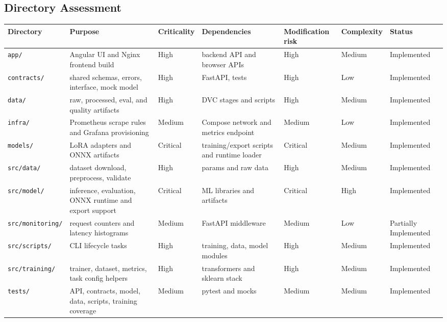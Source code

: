 \subsection{Directory Assessment}
\begin{longtable}{@{}p{}p{}p{}p{}p{}p{}p{}@{}}
\toprule
\textbf{Directory} & \textbf{Purpose} & \textbf{Criticality} & \textbf{Dependencies} & \textbf{Modification risk} & \textbf{Complexity} & \textbf{Status} \\
\midrule
\endhead
\texttt{app/} & Angular UI and Nginx frontend build & High & backend API and browser APIs & High & Medium & Implemented \\
\texttt{contracts/} & shared schemas, errors, interface, mock model & High & FastAPI, tests & High & Low & Implemented \\
\texttt{data/} & raw, processed, eval, and quality artifacts & High & DVC stages and scripts & High & Medium & Implemented \\
\texttt{infra/} & Prometheus scrape rules and Grafana provisioning & Medium & Compose network and metrics endpoint & Medium & Low & Implemented \\
\texttt{models/} & LoRA adapters and ONNX artifacts & Critical & training/export scripts and runtime loader & Critical & Medium & Implemented \\
\texttt{src/data/} & dataset download, preprocess, validate & High & params and raw data & High & Medium & Implemented \\
\texttt{src/model/} & inference, evaluation, ONNX runtime and export support & Critical & ML libraries and artifacts & Critical & High & Implemented \\
\texttt{src/monitoring/} & request counters and latency histograms & Medium & FastAPI middleware & Medium & Low & Partially Implemented \\
\texttt{src/scripts/} & CLI lifecycle tasks & High & training, data, model modules & High & Medium & Implemented \\
\texttt{src/training/} & trainer, dataset, metrics, task config helpers & High & transformers and sklearn stack & High & Medium & Implemented \\
\texttt{tests/} & API, contracts, model, data, scripts, training coverage & Medium & pytest and mocks & Medium & Medium & Implemented \\
\bottomrule
\end{longtable}

